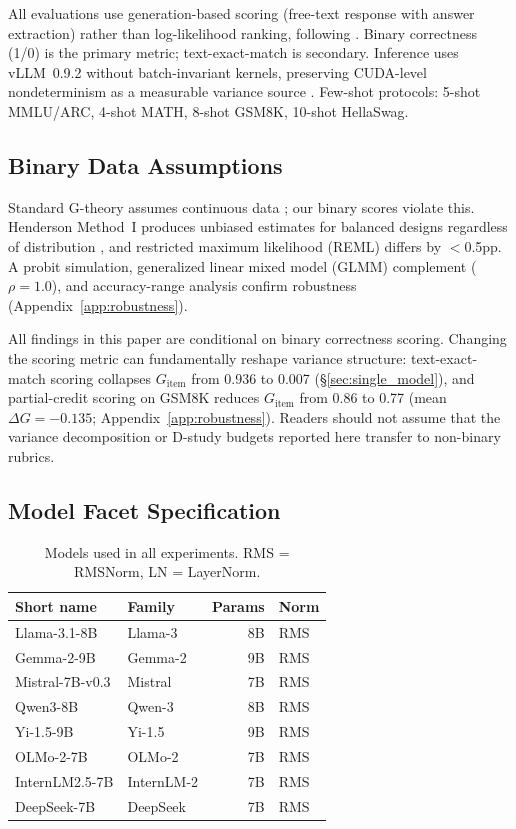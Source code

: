 All evaluations use generation-based scoring (free-text response with answer extraction) rather than log-likelihood ranking, following \citet{hua2025flaw}. Binary correctness (1/0) is the primary metric; text-exact-match is secondary. Inference uses vLLM~0.9.2 without batch-invariant kernels, preserving CUDA-level nondeterminism as a measurable variance source \cite{messina2026background, thinkingmachines2025batch}. Few-shot protocols: 5-shot MMLU/ARC, 4-shot MATH, 8-shot GSM8K, 10-shot HellaSwag.

\subsection{Binary Data Assumptions}
\label{sec:binary}

Standard G-theory assumes continuous data \cite{shavelson1991generalizability}; our binary scores violate this. Henderson Method~I produces unbiased estimates for balanced designs regardless of distribution \cite[Ch.~12]{brennan2001generalizability}, and restricted maximum likelihood (REML) differs by $<$0.5pp. A probit simulation, generalized linear mixed model (GLMM) complement ($\rho = 1.0$), and accuracy-range analysis confirm robustness (Appendix~\ref{app:robustness}).

All findings in this paper are conditional on binary correctness scoring. Changing the scoring metric can fundamentally reshape variance structure: text-exact-match scoring collapses $G_\text{item}$ from 0.936 to 0.007 (\S\ref{sec:single_model}), and partial-credit scoring on GSM8K reduces $G_\text{item}$ from 0.86 to 0.77 (mean $\Delta G = -0.135$; Appendix~\ref{app:robustness}). Readers should not assume that the variance decomposition or D-study budgets reported here transfer to non-binary rubrics.

\subsection{Model Facet Specification}

\begin{table}[t]
\centering
\caption{Models used in all experiments. RMS = RMSNorm, LN = LayerNorm.}
\label{tab:model_ids}
\scriptsize
\begin{tabular*}{\columnwidth}{@{\extracolsep{\fill}}llrl@{}}
\toprule
Short name & Family & Params & Norm \\
\midrule
Llama-3.1-8B & Llama-3 & 8B & RMS \\
Gemma-2-9B & Gemma-2 & 9B & RMS \\
Mistral-7B-v0.3 & Mistral & 7B & RMS \\
Qwen3-8B & Qwen-3 & 8B & RMS \\
Yi-1.5-9B & Yi-1.5 & 9B & RMS \\
OLMo-2-7B & OLMo-2 & 7B & RMS \\
InternLM2.5-7B & InternLM-2 & 7B & RMS \\
DeepSeek-7B & DeepSeek & 7B & RMS \\
\bottomrule
\end{tabular*}
\end{table}


